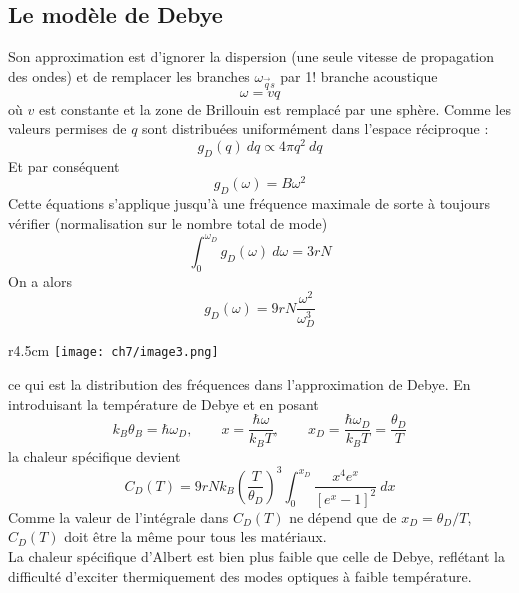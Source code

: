 	\subsection{Le modèle de Debye}
	Son approximation est d'ignorer la dispersion (une seule vitesse de propagation 
	des ondes) et de remplacer les branches $\omega_{\vec{q}s}$ par 1! branche 
	acoustique
	\begin{equation}
	\omega = vq
	\end{equation}
	où $v$ est constante et la zone de Brillouin est remplacé par une  sphère. 
	Comme les valeurs permises de $q$ sont distribuées uniformément dans l'espace 
	réciproque :
	\begin{equation}
	g_D(q)\ dq \propto 4\pi q^2\ dq
	\end{equation}
	Et par conséquent
	\begin{equation}
	g_D(\omega) = B\omega^2
	\end{equation}
	Cette équations s'applique jusqu'à une fréquence maximale de sorte à toujours 
	vérifier (normalisation sur le nombre total de mode)
	\begin{equation}
	\int_0^{\omega_D} g_D(\omega)\ d\omega = 3rN
	\end{equation}
	On a alors
	\begin{equation}
	g_D(\omega) = 9rN\dfrac{\omega^2}{\omega_D^3}
	\end{equation}
	\begin{wrapfigure}[10]{r}{4.5cm}
	\vspace{-0.6cm}
	\texttt{[image: ch7/image3.png]}
	\end{wrapfigure}
	ce qui est la distribution des fréquences dans l'approximation de Debye. En 
	introduisant la température de Debye et en posant
	\begin{equation}
	k_B\theta_B = \hbar\omega_D,\qquad x=\dfrac{\hbar\omega}{k_BT},\qquad x_D = 
	\dfrac{\hbar\omega_D}{k_BT}=\dfrac{\theta_D}{T}
	\end{equation}
	la chaleur spécifique devient
	\begin{equation}
	C_D(T) = 9rNk_B\left(\dfrac{T}{\theta_D}\right)^3\int_0^{x_D}\dfrac{x^4e^x}{
	\left[e^x-1\right]^2}\ dx
	\end{equation}
	Comme la valeur de l'intégrale dans $C_D(T)$ ne dépend que de $x_D=\theta_D/T$, 
	$C_D(T)$ doit être la même pour tous les matériaux.\\
	La chaleur spécifique d'Albert est bien plus faible que celle de Debye, reflétant 
	la difficulté d’exciter thermiquement des modes optiques à faible température.	
